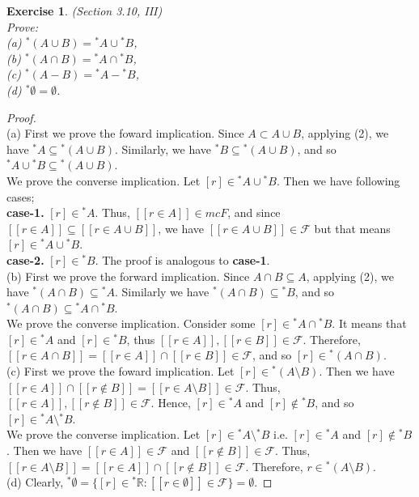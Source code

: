 \documentclass[a4paper, 11pt, openany]{book}
\theoremstyle{plain}
\newtheorem{exercise}{Exercise}[chapter]
\theoremstyle{plain}
\newcommand{\mc}{\mathcal}
\newcommand{\R}{\mathbb{R}}
\newcommand{\hyp}{{}^*}
\begin{document}
  \begin{exercise}
    (Section 3.10, III) \\
    Prove: \\
    (a) ${}^* (A \cup B) = {}^* A \cup {}^* B$, \\
    (b) ${}^* (A \cap B)= {}^* A \cap {}^* B$, \\
    (c) $\hyp (A-B)=\hyp A - \hyp B$, \\
    (d) $\hyp \emptyset =\emptyset$.
  \end{exercise}
  \begin{proof} $ $ \\
    (a) First we prove the foward implication. Since $A \subset A \cup B$, applying (2), we have ${}^* A \subseteq {}^* (A \cup B)$. Similarly, we have ${}^* B \subseteq {}^* (A \cup B)$, and so ${}^* A \cup {}^* B \subseteq {}^* (A \cup B)$. \\
    We prove the converse implication. Let $[r] \in {}^* A \cup {}^* B$. Then we have following cases; \\
    \textbf{case-1.} $[r] \in {}^* A$. Thus, $[[r \in A]] \in mc{F}$, and since $[[r \in A]] \subseteq [[r \in A \cup B]]$, we have $[[r \in A \cup B]] \in \mc{F}$ but that means $[r] \in {}^* A \cup {}^* B$. \\
    \textbf{case-2.} $[r] \in {}^* B$. The proof is analogous to \textbf{case-1}. \\

    (b) First we prove the forward implication. Since $A \cap B \subseteq A$, applying (2), we have ${}^* (A \cap B) \subseteq {}^* A$. Similarly we have $\hyp (A \cap B) \subseteq \hyp B$, and so $\hyp (A \cap B) \subseteq \hyp A \cap \hyp B$. \\
    We prove the converse implication. Consider some $[r] \in \hyp A \cap \hyp B$. It means that $[r] \in \hyp A$ and $[r] \in \hyp B$, thus $[[r \in A]], [[r \in B]] \in \mc{F}$. Therefore, $[[r \in A \cap B]]=[[r \in A]] \cap [[r \in B]] \in \mc{F}$, and so $[r] \in \hyp (A \cap B)$.  \\

    (c) First we prove the foward implication. Let $[r] \in \hyp (A \setminus B)$. Then we have $[[r \in A]] \cap [[r \notin B]]=[[r \in A \setminus B]] \in \mc{F}$. Thus, $[[r \in A]], [[r \notin B]] \in \mc{F}$. Hence, $[r] \in \hyp A$ and $[r] \notin \hyp B$, and so $[r] \in \hyp A \setminus \hyp B$. \\
    We prove the converse implication. Let $[r] \in \hyp A \setminus \hyp B$ i.e. $[r] \in \hyp A$ and $[r] \notin \hyp B$. Then we have $[[r \in A]] \in \mc{F}$ and $[[r \notin B]] \in \mc{F}$. Thus, $[[r \in A \setminus B]]=[[r \in A]] \cap [[r \notin B]] \in \mc{F}$. Therefore, $r \in \hyp (A \setminus B)$. \\

    (d) Clearly, $\hyp \emptyset =\{ [r] \in \hyp \R: [[r \in \emptyset]] \in \mc{F}\}=\emptyset$. 
  \end{proof}
\end{document}
